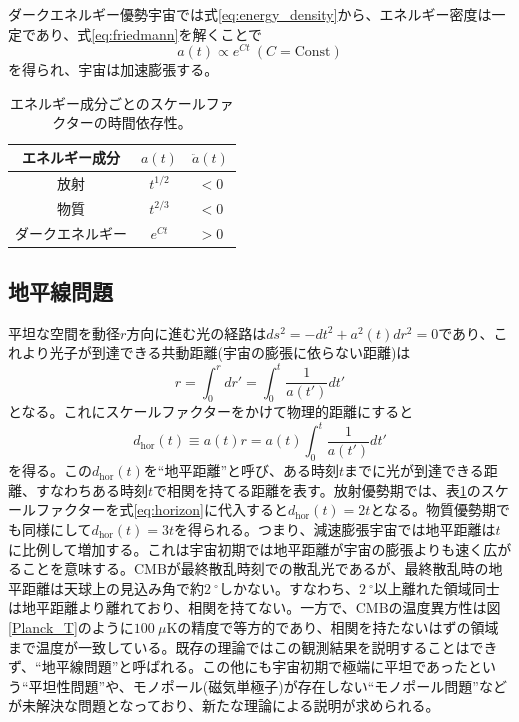 ダークエネルギー優勢宇宙では式\eqref{eq:energy_density}から、エネルギー密度は一定であり、式\eqref{eq:friedmann}を解くことで
\begin{equation}
  a(t) \propto e^{Ct} ~ (C = \mathrm{Const})
\end{equation}
を得られ、宇宙は加速膨張する。
\begin{table}[htbp]
  \centering
  \caption{エネルギー成分ごとのスケールファクターの時間依存性。}
  \vspace{3mm}
  \begin{tabular}{ccc} \hline
    エネルギー成分 & $a(t)$ & $\ddot{a}(t)$ \\ \hline
    放射 & $t^{1/2}$ & $< 0$ \\
    物質 & $t^{2/3}$ & $< 0$ \\
    ダークエネルギー & $e^{Ct}$ & $> 0$ \\ \hline
  \end{tabular}
  \label{rad_vs_mat}
\end{table}

\subsection{地平線問題}
平坦な空間を動径$r$方向に進む光の経路は$ds^{2} = -dt^{2} + a^{2}(t)dr^{2} = 0$であり、これより光子が到達できる共動距離(宇宙の膨張に依らない距離)は
\begin{equation}
  r = \int_{0}^{r}dr' = \int_{0}^{t}\frac{1}{a(t')}dt'
\end{equation}
となる。これにスケールファクターをかけて物理的距離にすると
\begin{equation}
  d_{\mathrm{hor}}(t)\equiv a(t)r = a(t)\int_{0}^{t}\frac{1}{a(t')}dt' \label{eq:horizon}
\end{equation}
を得る。この$d_{\mathrm{hor}}(t)$を``地平距離''と呼び、ある時刻$t$までに光が到達できる距離、すなわちある時刻$t$で相関を持てる距離を表す。放射優勢期では、表\ref{rad_vs_mat}のスケールファクターを式\eqref{eq:horizon}に代入すると$d_{\mathrm{hor}}(t) = 2t$となる。物質優勢期でも同様にして$d_{\mathrm{hor}}(t) = 3t$を得られる。つまり、減速膨張宇宙では地平距離は$t$に比例して増加する。これは宇宙初期では地平距離が宇宙の膨張よりも速く広がることを意味する。CMBが最終散乱時刻での散乱光であるが、最終散乱時の地平距離は天球上の見込み角で約$\SI{2}{^{\circ}}$しかない。すなわち、$\SI{2}{^{\circ}}$以上離れた領域同士は地平距離より離れており、相関を持てない。一方で、CMBの温度異方性は図\ref{Planck_T}のように$\SI{100}{\mu\mathrm{K}}$の精度で等方的であり、相関を持たないはずの領域まで温度が一致している。既存の理論ではこの観測結果を説明することはできず、``地平線問題''と呼ばれる。この他にも宇宙初期で極端に平坦であったという``平坦性問題''や、モノポール(磁気単極子)が存在しない``モノポール問題''などが未解決な問題となっており、新たな理論による説明が求められる。

